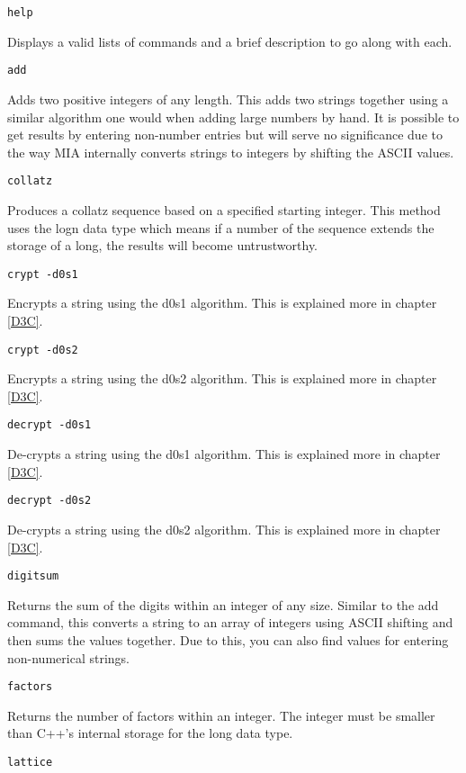 \begin{lstlisting}
help
\end{lstlisting}
Displays a valid lists of commands and a brief description to go along with each.
\begin{lstlisting} 
add   
\end{lstlisting}
Adds two positive integers of any length. This adds two strings together using a similar algorithm one would when adding large numbers by hand. It is possible to get results by entering non-number entries but will serve no significance due to the way MIA internally converts strings to integers by shifting the ASCII values.
\begin{lstlisting} 
collatz   
\end{lstlisting}
Produces a collatz sequence based on a specified starting integer. This method uses the logn data type which means if a number of the sequence extends the storage of a long, the results will become untrustworthy. 
\begin{lstlisting} 
crypt -d0s1   
\end{lstlisting}
Encrypts a string using the d0s1 algorithm. This is explained more in chapter \ref{D3C}.
\begin{lstlisting} 
crypt -d0s2  
\end{lstlisting}
Encrypts a string using the d0s2 algorithm. This is explained more in chapter \ref{D3C}.
\begin{lstlisting} 
decrypt -d0s1   
\end{lstlisting}
De-crypts a string using the d0s1 algorithm. This is explained more in chapter \ref{D3C}.
\begin{lstlisting} 
decrypt -d0s2   
\end{lstlisting}
De-crypts a string using the d0s2 algorithm. This is explained more in chapter \ref{D3C}.
\begin{lstlisting} 
digitsum 
\end{lstlisting}
Returns the sum of the digits within an integer of any size. Similar to the add command, this converts a string to an array of integers using ASCII shifting and then sums the values together. Due to this, you can also find values for entering non-numerical strings.
\begin{lstlisting} 
factors   
\end{lstlisting}
Returns the number of factors within an integer. The integer must be smaller than C++'s internal storage for the long data type.
\begin{lstlisting} 
lattice   
\end{lstlisting}
